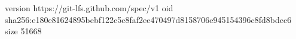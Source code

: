version https://git-lfs.github.com/spec/v1
oid sha256:e180e81624895bebf122c5c8faf2ee470497d8158706e945154396c8fd8bdcc6
size 51668
